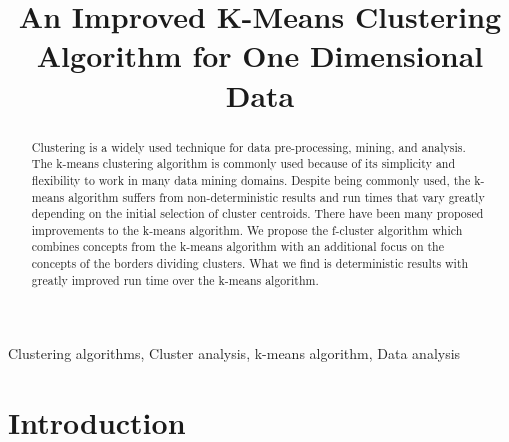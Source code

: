 \documentclass[conference,compsoc]{IEEEtran}
\begin{document}
\title{An Improved K-Means Clustering Algorithm for One Dimensional Data}

\author{
\and

\and

}

\maketitle

\begin{abstract}
Clustering is a widely used technique for data pre-processing, mining, and analysis. The k-means clustering algorithm is commonly used because of its simplicity and flexibility to work in many data mining domains. Despite being commonly used, the k-means algorithm suffers from non-deterministic results and run times that vary greatly depending on the initial selection of cluster centroids. There have been many proposed improvements to the k-means algorithm. We propose the f-cluster algorithm which combines concepts from the k-means algorithm with an additional focus on the concepts of the borders dividing clusters. What we find is deterministic results with greatly improved run time over the k-means algorithm.
\end{abstract}

\begin{IEEEkeywords}
Clustering algorithms, Cluster analysis, k-means algorithm, Data analysis
\end{IEEEkeywords}

\section{Introduction}
\end{document}
